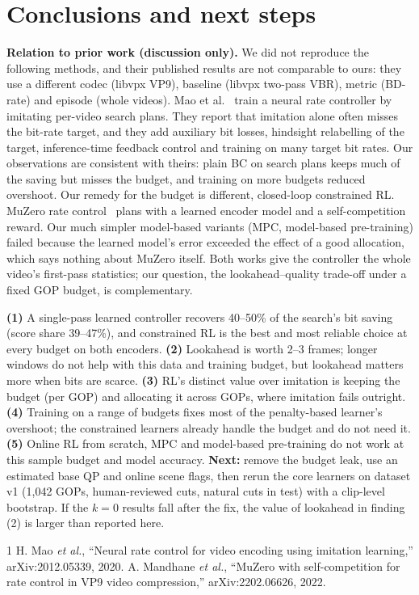 \documentclass[conference,10pt]{IEEEtran}
\begin{document}
\section{Conclusions and next steps}
\textbf{Relation to prior work (discussion only).} We did not reproduce the following methods, and their published results are not comparable to ours: they use a different codec (libvpx VP9), baseline (libvpx two-pass VBR), metric (BD-rate) and episode (whole videos). Mao et al.~\cite{mao2020neural} train a neural rate controller by imitating per-video search plans. They report that imitation alone often misses the bit-rate target, and they add auxiliary bit losses, hindsight relabelling of the target, inference-time feedback control and training on many target bit rates. Our observations are consistent with theirs: plain BC on search plans keeps much of the saving but misses the budget, and training on more budgets reduced overshoot. Our remedy for the budget is different, closed-loop constrained RL. MuZero rate control~\cite{mandhane2022muzero} plans with a learned encoder model and a self-competition reward. Our much simpler model-based variants (MPC, model-based pre-training) failed because the learned model's error exceeded the effect of a good allocation, which says nothing about MuZero itself. Both works give the controller the whole video's first-pass statistics; our question, the lookahead--quality trade-off under a fixed GOP budget, is complementary.

\textbf{(1)} A single-pass learned controller recovers 40--50\% of the search's bit saving (score share 39--47\%), and constrained RL is the best and most reliable choice at every budget on both encoders.
\textbf{(2)} Lookahead is worth 2--3 frames; longer windows do not help with this data and training budget, but lookahead matters more when bits are scarce.
\textbf{(3)} RL's distinct value over imitation is keeping the budget (per GOP) and allocating it across GOPs, where imitation fails outright.
\textbf{(4)} Training on a range of budgets fixes most of the penalty-based learner's overshoot; the constrained learners already handle the budget and do not need it.
\textbf{(5)} Online RL from scratch, MPC and model-based pre-training do not work at this sample budget and model accuracy.
\textbf{Next:} remove the budget leak, use an estimated base QP and online scene flags, then rerun the core learners on dataset v1 (1{,}042 GOPs, human-reviewed cuts, natural cuts in test) with a clip-level bootstrap. If the $k{=}0$ results fall after the fix, the value of lookahead in finding (2) is larger than reported here.
\par
{\footnotesize
\begin{thebibliography}{1}
 H. Mao \emph{et al.}, ``Neural rate control for video encoding using imitation learning,'' arXiv:2012.05339, 2020.
 A. Mandhane \emph{et al.}, ``MuZero with self-competition for rate control in VP9 video compression,'' arXiv:2202.06626, 2022.
\end{thebibliography}}
\end{document}
